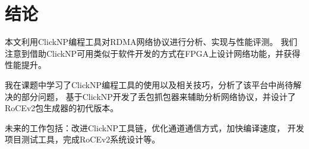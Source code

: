 \chapter{结论}
本文利用ClickNP编程工具对RDMA网络协议进行分析、实现与性能评测。
我们注意到借助ClickNP可用类似于软件开发的方式在FPGA上设计网络功能，并获得性能提升。

我在课题中学习了ClickNP编程工具的使用以及相关技巧，分析了该平台中尚待解决的部分问题，
基于ClickNP开发了丢包抓包器来辅助分析网络协议，并设计了RoCEv2包生成器的初代版本。

未来的工作包括：改进ClickNP工具链，优化通道通信方式，加快编译速度，
开发项目测试工具，完成RoCEv2系统设计等。
